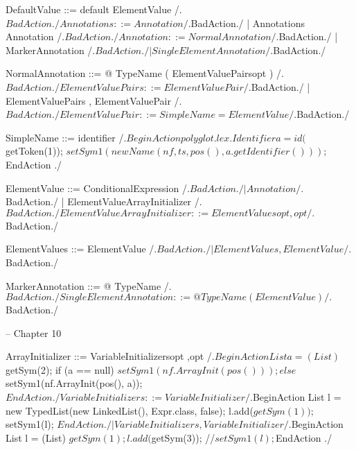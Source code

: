     DefaultValue ::= default ElementValue
        /.$BadAction./
    
    Annotations ::= Annotation
        /.$BadAction./
                  | Annotations Annotation
        /.$BadAction./
    
    Annotation ::= NormalAnnotation
        /.$BadAction./
                 | MarkerAnnotation
        /.$BadAction./
                 | SingleElementAnnotation
        /.$BadAction./
    
    NormalAnnotation ::= @ TypeName ( ElementValuePairsopt )
        /.$BadAction./
    
    ElementValuePairs ::= ElementValuePair
        /.$BadAction./
                        | ElementValuePairs , ElementValuePair
        /.$BadAction./
    
    ElementValuePair ::= SimpleName = ElementValue
        /.$BadAction./
    
    SimpleName ::= identifier
        /.$BeginAction
                    polyglot.lex.Identifier a = id($getToken(1));
                    $setSym1(new Name(nf, ts, pos(), a.getIdentifier()));
          $EndAction
        ./

    ElementValue ::= ConditionalExpression
        /.$BadAction./
                   | Annotation
        /.$BadAction./
                   | ElementValueArrayInitializer
        /.$BadAction./
    
    ElementValueArrayInitializer ::= { ElementValuesopt ,opt }
        /.$BadAction./
    
    ElementValues ::= ElementValue
        /.$BadAction./
                    | ElementValues , ElementValue
        /.$BadAction./
    
    MarkerAnnotation ::= @ TypeName
        /.$BadAction./
    
    SingleElementAnnotation ::= @ TypeName ( ElementValue )
        /.$BadAction./
    
    -- Chapter 10
    
    ArrayInitializer ::= { VariableInitializersopt ,opt }
        /.$BeginAction
                    List a = (List) $getSym(2);
                    if (a == null)
                         $setSym1(nf.ArrayInit(pos()));
                    else $setSym1(nf.ArrayInit(pos(), a));
          $EndAction
        ./
    
    VariableInitializers ::= VariableInitializer
        /.$BeginAction
                    List l = new TypedList(new LinkedList(), Expr.class, false);
                    l.add($getSym(1));
                    $setSym1(l);
          $EndAction
        ./
                           | VariableInitializers , VariableInitializer
        /.$BeginAction
                    List l = (List) $getSym(1);
                    l.add($getSym(3));
                    //$setSym1(l);
          $EndAction
        ./
    
